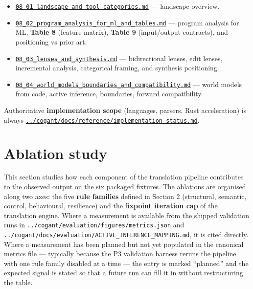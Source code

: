 \documentclass[
]{article}
\providecommand{\tightlist}{%
  \setlength{\itemsep}{0pt}\setlength{\parskip}{0pt}}
\begin{document}
\begin{itemize}
\tightlist
\item
  \href{08_01_landscape_and_tool_categories.md}{\texttt{08\_01\_landscape\_and\_tool\_categories.md}}
  --- landscape overview.
\item
  \href{08_02_program_analysis_for_ml_and_tables.md}{\texttt{08\_02\_program\_analysis\_for\_ml\_and\_tables.md}}
  --- program analysis for ML, \textbf{Table 8} (feature matrix),
  \textbf{Table 9} (input/output contracts), and positioning vs prior
  art.
\item
  \href{08_03_lenses_and_synthesis.md}{\texttt{08\_03\_lenses\_and\_synthesis.md}}
  --- bidirectional lenses, edit lenses, incremental analysis,
  categorical framing, and synthesis positioning.
\item
  \href{08_04_world_models_boundaries_and_compatibility.md}{\texttt{08\_04\_world\_models\_boundaries\_and\_compatibility.md}}
  --- world models from code, active inference, boundaries, forward
  compatibility.
\end{itemize}

Authoritative \textbf{implementation scope} (languages, parsers, Rust
acceleration) is always
\href{../cogant/docs/reference/implementation_status.md}{\texttt{../cogant/docs/reference/implementation\_status.md}}.

\newpage

\section{Ablation study}\label{ablation-study}

This section studies how each component of the translation pipeline
contributes to the observed output on the six packaged fixtures. The
ablations are organised along two axes: the five \textbf{rule families}
defined in Section 2 (structural, semantic, control, behavioural,
resilience) and the \textbf{fixpoint iteration cap} of the translation
engine. Where a measurement is available from the shipped validation
runs in \texttt{../cogant/evaluation/figures/metrics.json} and
\texttt{../cogant/docs/evaluation/ACTIVE\_INFERENCE\_MAPPING.md}, it is
cited directly. Where a measurement has been planned but not yet
populated in the canonical metrics file --- typically because the P3
validation harness reruns the pipeline with one rule family disabled at
a time --- the entry is marked ``planned'' and the expected signal is
stated so that a future run can fill it in without restructuring the
table.
\end{document}
